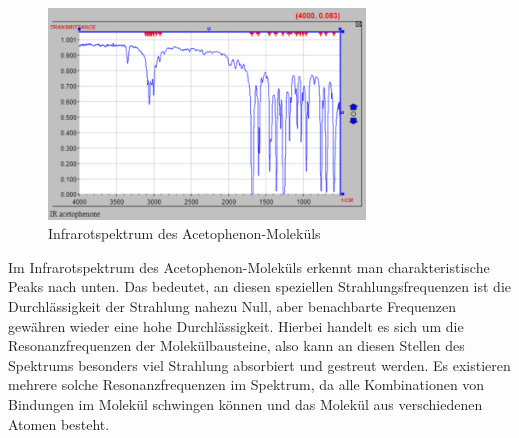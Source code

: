 \documentclass{scrartcl}
\begin{document}
\begin{figure}[h]
  \caption{Infrarotspektrum des Acetophenon-Moleküls}
  \centering
    \includegraphics[width=0.75\textwidth]{acetophenon.PNG}
\end{figure}
Im Infrarotspektrum des Acetophenon-Moleküls erkennt man charakteristische Peaks nach unten. Das bedeutet, an diesen speziellen Strahlungsfrequenzen ist die Durchlässigkeit der Strahlung nahezu Null, aber benachbarte Frequenzen gewähren wieder eine hohe Durchlässigkeit. Hierbei handelt es sich um die Resonanzfrequenzen der Molekülbausteine, also kann an diesen Stellen des Spektrums besonders viel Strahlung absorbiert und gestreut werden. Es existieren mehrere solche Resonanzfrequenzen im Spektrum, da alle Kombinationen von Bindungen im Molekül schwingen können und das Molekül aus verschiedenen Atomen besteht.
\end{document}
